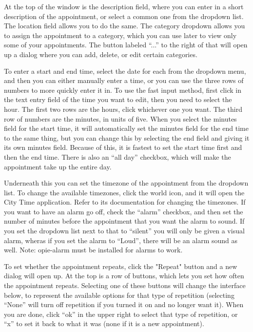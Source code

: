 \documentclass[12pt,letterpaper,oneside, openany]{book} \usepackage[latin1] {inputenc}
\begin{document}
At the top of the window is the description field, where you can enter in a short description of the appointment, or select a common one from the dropdown list. The location field allows you to do the same. The category dropdown allows you to assign the appointment to a category, which you can use later to view only some of your appointments. The button labeled ``...'' to the right of that will open up a dialog where you can add, delete, or edit certain categories. 

To enter a start and end time, select the date for each from the dropdown menu, and then you can either manually enter a time, or you can use the three rows of numbers to more quickly enter it in. To use the fast input method, first click in the text entry field of the time you want to edit, then you need to select the hour. The first two rows are the hours, click whichever one you want. The third row of numbers are the minutes, in units of five. When you select the minutes field for the start time, it will automatically set the minutes field for the end time to the same thing, but you can change this by selecting the end field and giving it its own minutes field. Because of this, it is fastest to set the start time first and then the end time. There is also an ``all day'' checkbox, which will make the appointment take up the entire day. 

Underneath this you can set the timezone of the appointment from the dropdown list. To change the available timezones, click the world icon, and it will open the City Time application. Refer to its documentation for changing the timezones. If you want to have an alarm go off, check the ``alarm'' checkbox, and then set the number of minutes before the appointment that you want the alarm to sound. If you set the dropdown list next to that to ``silent'' you will only be given a visual alarm, wheras if you set the alarm to ``Loud'', there will be an alarm sound as well. Note: opie-alarm must be installed for alarms to work. 

To set whether the appointment repeats, click the "Repeat" button and a new dialog will open up. At the top is a row of buttons, which lets you set how often the appointment repeats. Selecting one of these buttons will change the interface below, to represent the available options for that type of repetition (selecting ``None'' will turn off repetition if you turned it on and no longer want it). When you are done, click ``ok'' in the upper right to select that type of repetition, or ``x'' to set it back to what it was (none if it is a new appointment). 
\end{document}
